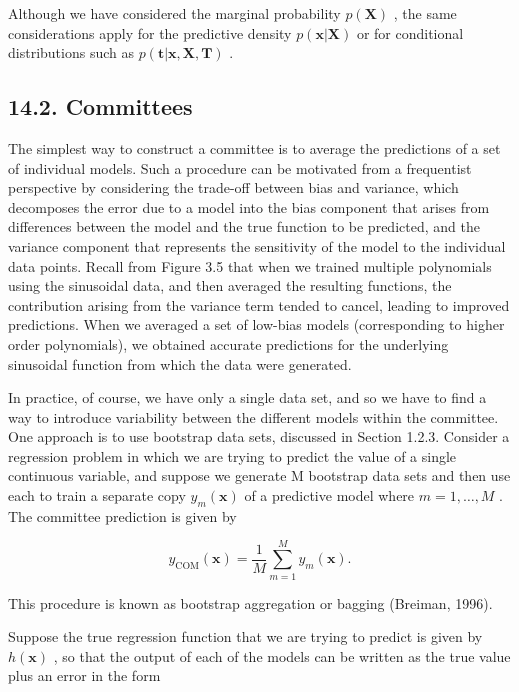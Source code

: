 \documentclass[
  10
]{article}
\begin{document}
Although we have considered the marginal probability
\(p ( \mathbf { X } )\) , the same considerations apply for the
predictive density \(p ( \mathbf { x } | \mathbf { X } )\) or for
conditional distributions such as
\(p ( \mathbf { t } | \mathbf { x } , \mathbf { X } , \mathbf { T } )\)
.

\subsection{14.2. Committees}\label{committees}

The simplest way to construct a committee is to average the predictions
of a set of individual models. Such a procedure can be motivated from a
frequentist perspective by considering the trade-off between bias and
variance, which decomposes the error due to a model into the bias
component that arises from differences between the model and the true
function to be predicted, and the variance component that represents the
sensitivity of the model to the individual data points. Recall from
Figure 3.5 that when we trained multiple polynomials using the
sinusoidal data, and then averaged the resulting functions, the
contribution arising from the variance term tended to cancel, leading to
improved predictions. When we averaged a set of low-bias models
(corresponding to higher order polynomials), we obtained accurate
predictions for the underlying sinusoidal function from which the data
were generated.

In practice, of course, we have only a single data set, and so we have
to find a way to introduce variability between the different models
within the committee. One approach is to use bootstrap data sets,
discussed in Section 1.2.3. Consider a regression problem in which we
are trying to predict the value of a single continuous variable, and
suppose we generate M bootstrap data sets and then use each to train a
separate copy \(y _ { m } ( \mathbf x )\) of a predictive model where
\(m = 1 , \ldots , M\) . The committee prediction is given by

\[
y _ {\mathrm{COM}} (\mathbf {x}) = \frac {1}{M} \sum_ {m = 1} ^ {M} y _ {m} (\mathbf {x}).\tag{14.7}
\]

This procedure is known as bootstrap aggregation or bagging (Breiman,
1996).

Suppose the true regression function that we are trying to predict is
given by \(h ( \mathbf { x } )\) , so that the output of each of the
models can be written as the true value plus an error in the form
\end{document}
